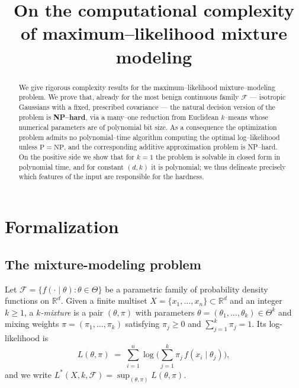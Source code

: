 \documentclass{amsart}
\theoremstyle{plain}
\theoremstyle{definition}
\newcommand{\R}{\mathbb{R}}
\begin{document}
\title{On the computational complexity of maximum--likelihood mixture modeling}
\maketitle

\begin{abstract}
We give rigorous complexity results for the maximum--likelihood mixture--modeling
problem. We prove that, already for the most benign continuous family
$\mathcal F$ --- isotropic Gaussians with a fixed, prescribed covariance --- the
natural decision version of the problem is \textbf{NP--hard}, via a
many--one reduction from Euclidean $k$--means whose numerical parameters are of
polynomial bit size. As a consequence the optimization problem admits no
polynomial--time algorithm computing the optimal log--likelihood unless
$\mathrm{P}=\mathrm{NP}$, and the corresponding additive approximation problem is
NP--hard. On the positive side we show that for $k=1$ the problem is solvable in
closed form in polynomial time, and for constant $(d,k)$ it is polynomial; we thus
delineate precisely which features of the input are responsible for the hardness.
\end{abstract}

\section{Formalization}

\subsection{The mixture-modeling problem}
Let $\mathcal F=\{f(\cdot\mid\theta):\theta\in\Theta\}$ be a parametric family of
probability density functions on $\R^{d}$. Given a finite multiset
$X=\{x_{1},\dots,x_{n}\}\subset\R^{d}$ and an integer $k\ge1$, a
\emph{$k$-mixture} is a pair $(\theta,\pi)$ with parameters
$\theta=(\theta_{1},\dots,\theta_{k})\in\Theta^{k}$ and mixing weights
$\pi=(\pi_{1},\dots,\pi_{k})$ satisfying $\pi_{j}\ge0$ and
$\sum_{j=1}^{k}\pi_{j}=1$. Its log-likelihood is
\begin{equation}\label{eq:loglik}
L(\theta,\pi)\;=\;\sum_{i=1}^{n}\log\!\Big(\sum_{j=1}^{k}\pi_{j}\,f(x_{i}\mid\theta_{j})\Big),
\end{equation}
and we write $L^{\ast}(X,k,\mathcal F)=\sup_{(\theta,\pi)}L(\theta,\pi)$.
\end{document}
